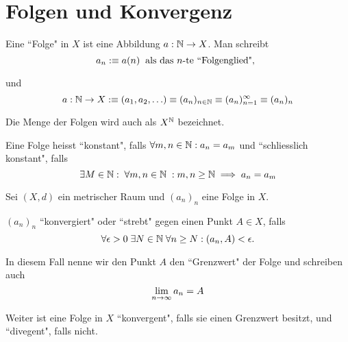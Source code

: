 \section{Folgen und Konvergenz}

\setcounter{thm}{19}
\begin{mydef}[Folge]
	Eine ``Folge" in $X$ ist eine Abbildung $a: \mathbb{N} \to X$. Man schreibt
	\begin{equation}
		a_n :\equiv a(n) \;\; \text{als das $n$-te ``Folgenglied",}\;\;
	\end{equation}
	
	und
  \begin{equation}
  	a: \mathbb{N} \to X :\equiv (a_1, a_2, \ldots) \equiv (a_n)_{n\in\mathbb{N}} \equiv(a_n)_{n=1}^{\infty} \equiv (a_n)_n
  \end{equation}
  
	Die Menge der Folgen wird auch als $X^{\mathbb{N}}$ bezeichnet.
	
	Eine Folge heisst ``konstant", falls $\forall m,n \in \mathbb{N}: a_n=a_m$ und ``schliesslich konstant", falls 
	\begin{equation}
		\exists M\in \mathbb{N}: \; \forall m,n \in \mathbb{N} \; : m,n \geq \mathbb{N} \implies a_n = a_m
	\end{equation}
\end{mydef}

\begin{mydef}[Konvergenz]
	Sei $(X,d)$ ein metrischer Raum und $(a_n)_n$ eine Folge in $X$.
	
	$(a_n)_n$ ``konvergiert" oder ``strebt" gegen einen Punkt $A\in X$, falls 
	\begin{equation}
		\forall \epsilon > 0 \; \exists N \in \mathbb{N} \; \forall n \geq N: (a_n, A) < \epsilon.
	\end{equation}
	
	In diesem Fall nenne wir den Punkt $A$ den ``Grenzwert" der Folge und schreiben auch
	\begin{equation}
		\lim_{n \to \infty} a_n = A
	\end{equation}
	
	Weiter ist eine Folge in $X$ ``konvergent", falls sie einen Grenzwert besitzt, und ``divegent", falls nicht.
\end{mydef}


